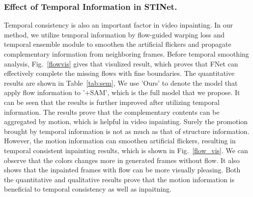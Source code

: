 \subsubsection{Effect of Temporal Information in STINet.}
Temporal consistency is also an important factor in video inpainting. In our method, we utilize temporal information by flow-guided warping loss and temporal ensemble module to smoothen the artificial flickers and propagate complementary information from neighboring frames. 
Before temporal smoothing analysis, Fig.~\ref{flowvis} gives that visulized result, which proves that FNet can effectively complete the missing flows with fine boundaries.
The quantitative results are shown in Table~\ref{tab:sem}, We use 'Ours' to denote the model that apply flow information to '+SAM', which is the full model that we propose. It can be seen that the results is further improved after utilizing temporal information. The results prove that the complementary contents can be aggregated by motion, which is helpful in video inpainting. Surely the promotion brought by temporal information is not as much as that of structure information. However, the motion information can smoothen artificial flickers, resulting in temporal consistent inpainting results, which is shown in Fig.~\ref{flow_vis}. We can observe that the colors changes more in generated frames without flow. It also shows that the inpainted frames with flow can be more visually pleasing.  
Both the quantitative and qualitative results prove that the motion information is beneficial to temporal consistency as well as inpaitning.



